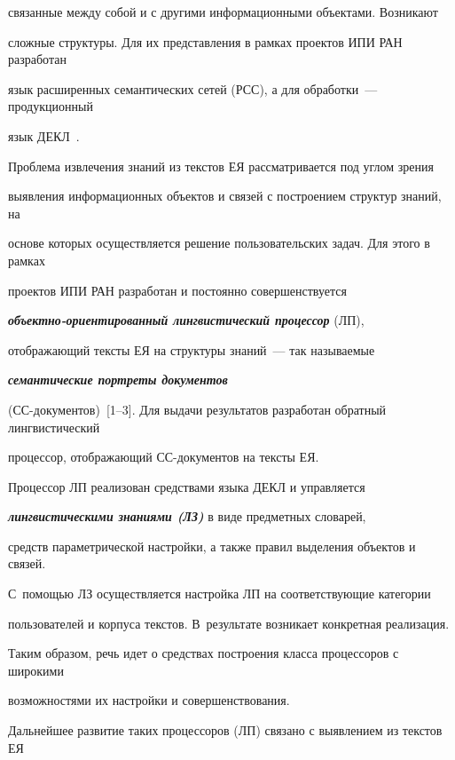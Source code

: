 связанные между собой и с другими информационными объектами. Возникают 


сложные структуры. Для их представления в рамках проектов ИПИ РАН разработан 


язык расширенных семантических сетей (РСС), а для обработки~--- продукционный 


язык ДЕКЛ~\cite{3-2-10}.





Проблема извлечения знаний из текстов ЕЯ рассматривается под углом зрения 


выявления информационных объектов и связей с построением структур знаний, на 


основе которых осуществляется решение пользовательских задач. Для этого в рамках 


проектов ИПИ РАН разработан и постоянно совершенствуется 


{\bfseries\textit{объектно-ориентированный лингвистический процессор}} (ЛП), 


отображающий тексты ЕЯ на структуры знаний~--- так называемые 


{\bfseries\textit{семантические портреты документов}} 


(СС-до\-ку\-мен\-тов)~[1--3].  Для выдачи результатов разработан обратный лингвистический 


процессор, отображающий СС-документов на тексты ЕЯ.   





         Процессор ЛП реализован средствами языка ДЕКЛ и управляется 


{\bfseries\textit{лингвистическими знаниями (ЛЗ)}} в виде предметных словарей, 


средств параметрической настройки, а также правил выделения объектов и связей. 


С~помощью ЛЗ осуществляется настройка ЛП на соответствующие категории 


пользователей и корпуса текстов. В~результате возникает конкретная реализация. 


Таким образом, речь идет о средствах построения класса процессоров с широкими 


возможностями их настройки и совершенствования. 





         Дальнейшее развитие таких процессоров (ЛП) связано с выявлением из текстов ЕЯ 


